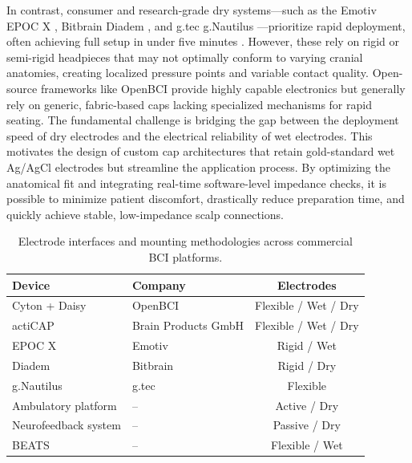In contrast, consumer and research-grade dry systems—such as the Emotiv EPOC X \cite{Emotiv_EPOCX}, Bitbrain Diadem \cite{Bitbrain_Diadem}, and g.tec g.Nautilus \cite{Gtec_GNautilusProFlexible}—prioritize rapid deployment, often achieving full setup in under five minutes \cite{he2023diversity}. However, these rely on rigid or semi-rigid headpieces that may not optimally conform to varying cranial anatomies, creating localized pressure points and variable contact quality. Open-source frameworks like OpenBCI \cite{OpenBCI_CytonDaisy, ariza2022low} provide highly capable electronics but generally rely on generic, fabric-based caps lacking specialized mechanisms for rapid seating. The fundamental challenge is bridging the gap between the deployment speed of dry electrodes and the electrical reliability of wet electrodes. This motivates the design of custom cap architectures that retain gold-standard wet Ag/AgCl electrodes but streamline the application process. By optimizing the anatomical fit and integrating real-time software-level impedance checks, it is possible to minimize patient discomfort, drastically reduce preparation time, and quickly achieve stable, low-impedance scalp connections.

\begin{table}[htbp]
    \renewcommand{\arraystretch}{1.2}
    \caption{Electrode interfaces and mounting methodologies across commercial BCI platforms.}
    \label{table:bci_electrodes}
    \centering
    \footnotesize
    \begin{tabularx}{\textwidth}{@{}
        >{\raggedright\arraybackslash}X
        >{\raggedright\arraybackslash}m{3.5cm}
        c @{}}
        \toprule
        \textbf{Device}                              & \textbf{Company}    & \textbf{Electrodes}  \\ \midrule
        Cyton + Daisy \cite{OpenBCI_CytonDaisy}      & OpenBCI             & Flexible / Wet / Dry \\
        actiCAP \cite{BrainProducts_ActiCap}         & Brain Products GmbH & Flexible / Wet / Dry \\
        EPOC X \cite{Emotiv_EPOCX}                   & Emotiv              & Rigid / Wet          \\
        Diadem \cite{Bitbrain_Diadem}                & Bitbrain            & Rigid / Dry          \\
        g.Nautilus \cite{Gtec_GNautilusProFlexible}  & g.tec               & Flexible             \\
        Ambulatory platform \cite{pinho2014wireless} & --                  & Active / Dry         \\
        Neurofeedback system \cite{Totev2023}        & --                  & Passive / Dry        \\
        BEATS \cite{Beats}                           & --                  & Flexible / Wet       \\ \bottomrule
    \end{tabularx}
\end{table}


